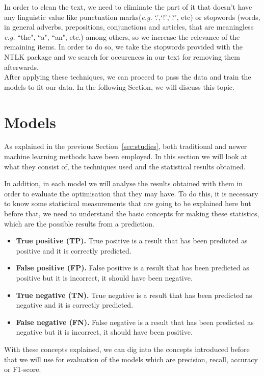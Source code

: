 In order to clean the text, we need to eliminate the part of it that doesn't have any linguistic value like punctuation marks(\textit{e.g.} `.',`!',`?', etc) or stopwords (words, in general adverbs, prepositions, conjunctions and articles, that are meaningless \textit{e.g.} ``the", ``a", ``an", etc.) among others, so we increase the relevance of the remaining items. In order to do so, we take the stopwords provided with the NTLK package and we search for occurences in our text for removing them afterwards.\\


After applying these techniques, we can proceed to pass the data and train the models to fit our data. In the following Section, we will discuss this topic.

\section{Models}
As explained in the previous Section~\ref{sec:studies}, both traditional and newer machine learning methods have been employed. In this section we will look at what they consist of, the techniques used and the statistical results obtained.

In addition, in each model we will analyse the results obtained with them in order to evaluate the optimisation that they may have. To do this, it is necessary to know some statistical measurements that are going to be explained here but before that, we need to understand the basic concepts for making these statistics, which are the possible results from a prediction.
\begin{itemize}
    \item\textbf{ True positive (TP).} True positive is a result that has been predicted as positive and it is correctly predicted.
    \item\textbf{ False positive (FP).} False positive is a result that has been predicted as positive but it is incorrect, it should have been negative. 
    \item \textbf{True negative (TN).} True negative is a result that has been predicted as negative and it is correctly predicted. 
    \item \textbf{False negative (FN).} False negative is a result that has been predicted as negative but it is incorrect, it should have been positive.
\end{itemize}

With these concepts explained, we can dig into the concepts introduced before that we will use for evaluation of the models which are precision, recall, accuracy or F1-score.

